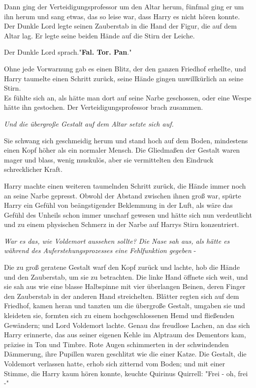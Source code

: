 {Dann ging der Verteidigungsprofessor um den Altar herum, fünfmal ging er um ihn herum und sang etwas, das so leise war, dass Harry es nicht hören konnte. Der Dunkle Lord legte seinen Zauberstab in die Hand der Figur, die auf dem Altar lag. Er legte seine beiden Hände auf die Stirn der Leiche.

Der Dunkle Lord sprach."\textbf{Fal. Tor. Pan}."

Ohne jede Vorwarnung gab es einen Blitz, der den ganzen Friedhof erhellte, und Harry taumelte einen Schritt zurück, seine Hände gingen unwillkürlich an seine Stirn.\\ Es fühlte sich an, als hätte man dort auf seine Narbe geschossen, oder eine Wespe hätte ihn gestochen. Der Verteidigungsprofessor brach zusammen.

\emph{Und die übergroße Gestalt auf dem Altar setzte sich auf.}

Sie schwang sich geschmeidig herum und stand hoch auf dem Boden, mindestens einen Kopf höher als ein normaler Mensch. Die Gliedmaßen der Gestalt waren mager und blass, wenig muskulös, aber sie vermittelten den Eindruck schrecklicher Kraft.

Harry machte einen weiteren taumelnden Schritt zurück, die Hände immer noch an seine Narbe gepresst. Obwohl der Abstand zwischen ihnen groß war, spürte Harry ein Gefühl von beängstigender Beklemmung in der Luft, als wäre das Gefühl des Unheils schon immer unscharf gewesen und hätte sich nun verdeutlicht und zu einem physischen Schmerz in der Narbe auf Harrys Stirn konzentriert.

\emph{War es das, wie Voldemort aussehen sollte? Die Nase sah aus, als hätte es während des Auferstehungsprozesses eine Fehlfunktion gegeben} -

Die zu groß geratene Gestalt warf den Kopf zurück und lachte, hob die Hände und den Zauberstab, um sie zu betrachten. Die linke Hand öffnete sich weit, und sie sah aus wie eine blasse Halbspinne mit vier überlangen Beinen, deren Finger den Zauberstab in der anderen Hand streichelten. Blätter regten sich auf dem Friedhof, kamen heran und tanzten um die übergroße Gestalt, umgaben sie und kleideten sie, formten sich zu einem hochgeschlossenen Hemd und fließenden Gewändern; und Lord Voldemort lachte. Genau das freudlose Lachen, an das sich Harry erinnerte, das aus seiner eigenen Kehle im Alptraum des Dementors kam, präzise in Ton und Timbre. Rote Augen schimmerten in der schwindenden Dämmerung, ihre Pupillen waren geschlitzt wie die einer Katze. Die Gestalt, die Voldemort verlassen hatte, erhob sich zitternd vom Boden; und mit einer Stimme, die Harry kaum hören konnte, keuchte Quirinus Quirrell: "Frei - oh, frei -"

}
